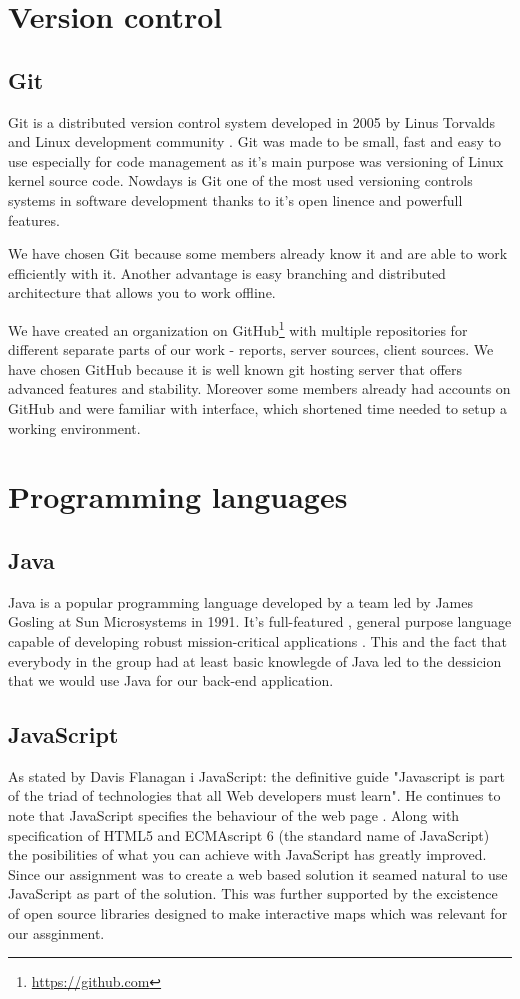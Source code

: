 \documentclass[11pt,a4paper,titlepage,oneside]{report}
\begin{document}
\section{Version control}
  \subsection{Git}
  Git is a distributed version control system developed in 2005 by Linus Torvalds and Linux development community \citep{ProGit}. Git was made to be small, fast and easy to use especially for code management as it's main purpose was versioning of Linux kernel source code. Nowdays is Git one of the most used versioning controls systems in software development thanks to it's open linence and powerfull features.

  We have chosen Git because some members already know it and are able to work efficiently with it. Another advantage is easy branching and distributed architecture that allows you to work offline. 
  
  We have created an organization on GitHub\footnote{\url{https://github.com}} with multiple repositories for different separate parts of our work - reports, server sources, client sources. We have chosen GitHub because it is well known git hosting server that offers advanced features and stability. Moreover some members already had accounts on GitHub and were familiar with interface, which shortened time needed to setup a working environment.

\section{Programming languages}
  \subsection{Java}
  Java is a popular programming language developed by a team led by James Gosling at Sun Microsystems in 1991. It's full-featured , general purpose language capable of developing robust mission-critical applications \citep{liang}. This and the fact that everybody in the group had at least basic knowlegde of Java led to the dessicion that we would use Java for our back-end application.  
  \subsection{JavaScript}
  As stated by Davis Flanagan i JavaScript: the definitive guide "Javascript is part of the triad of technologies that all Web developers must learn". He continues to note that JavaScript specifies the behaviour of the web page \citep{fd11}. Along with specification of HTML5 and ECMAscript 6 (the standard name of JavaScript) the posibilities of what you can achieve with JavaScript has greatly improved. Since our assignment was to create a web based solution it seamed natural to use JavaScript as part of the solution. This was further supported by the excistence of open source libraries designed to make interactive maps which was relevant for our assginment.
\end{document}
